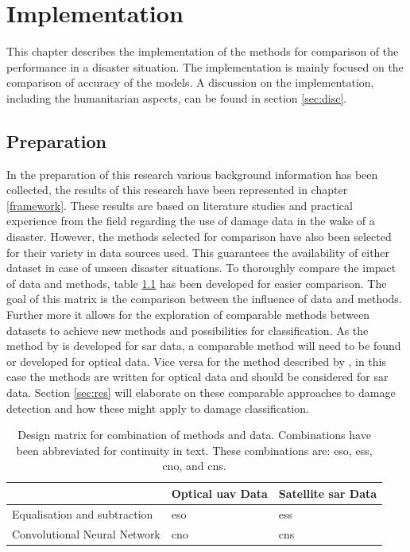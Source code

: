 \chapter{Implementation} \label{implem}

This chapter describes the implementation of the methods for comparison of the performance in a disaster situation. The implementation is mainly focused on the comparison of accuracy of the models. A discussion on the implementation, including the humanitarian aspects, can be found in section \ref{sec:disc}.

\section{Preparation} \label{sec:prep}
\noindent In the preparation of this research various background information has been collected, the results of this research have been represented in chapter \ref{framework}. These results are based on literature studies and practical experience from the field regarding the use of damage data in the wake of a disaster. However, the methods selected for comparison have also been selected for their variety in data sources used. This guarantees the availability of either dataset in case of unseen disaster situations. To thoroughly compare the impact of data and methods, table \ref{tab:matr} has been developed for easier comparison. The goal of this matrix is the comparison between the influence of data and methods. Further more it allows for the exploration of comparable methods between datasets to achieve new methods and possibilities for classification. As the method by \citet{Yun2015} is developed for \ac{sar} data, a comparable method will need to be found or developed for optical data. Vice versa for the method described by \citet{Vetrivel2016b}, in this case the methods are written for optical data and should be considered for \ac{sar} data. Section \ref{sec:res} will elaborate on these comparable approaches to damage detection and how these might apply to damage classification. \\

\begin{table} [h]
	\centering
	\captionsetup{justification=raggedright,singlelinecheck=false}
	\caption{\footnotesize{Design matrix for combination of methods and data. Combinations have been abbreviated for continuity in text. These combinations are: \ac{eso}, \ac{ess}, \ac{cno}, and \ac{cns}.}}
	\begin{footnotesize}
		\begin{tabular}{m{2.5cm}|m{2.5cm}|m{2.5cm}|}
			\hline
			& Optical \ac{uav} Data & Satellite \ac{sar} Data \\ \hline
			Equalisation and subtraction & \ac{eso} & \ac{ess} \\ \hline
			Convolutional Neural Network & \ac{cno} & \ac{cns} \\ 
			\hline
		\end{tabular}
	\end{footnotesize}
	\label{tab:matr}
\end{table}

